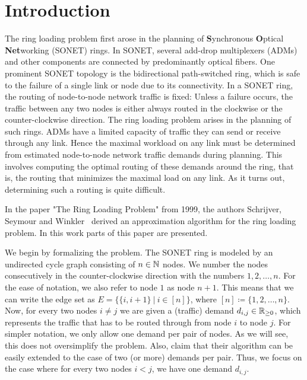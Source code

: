 \section{Introduction}

The ring loading problem first arose in the planning of \textbf{S}ynchronous \textbf{O}ptical \textbf{Net}working (SONET) rings.
In SONET, several add-drop multiplexers (ADMs) and other components are connected by predominantly optical fibers.
One prominent SONET topology is the bidirectional path-switched ring, which is safe to the failure of a single link or node due to its connectivity.
In a SONET ring, the routing of node-to-node network traffic is fixed: Unless a failure occurs, the traffic between any two nodes is either always routed in the clockwise or the counter-clockwise direction.
The ring loading problem arises in the planning of such rings.
ADMs have a limited capacity of traffic they can send or receive through any link.
Hence the maximal workload on any link must be determined from estimated node-to-node network traffic demands during planning.
This involves computing the optimal routing of these demands around the ring, that is, the routing that minimizes the maximal load on any link.
As it turns out, determining such a routing is quite difficult.

In the paper "The Ring Loading Problem" from 1999, the authors Schrijver, Seymour and Winkler~\cite{schrijver99} derived an approximation algorithm for the ring loading problem.
In this work parts of this paper are presented.

We begin by formalizing the problem.
The SONET ring is modeled by an undirected cycle graph consisting of $n \in \mathbb{N}$ nodes.
We number the nodes consecutively in the counter-clockwise direction with the numbers $1, 2, \dots, n$.
For the ease of notation, we also refer to node $1$ as node $n+1$.
This means that we can write the edge set as $E = \{\{i, i+1\}\ |\ i \in [n]\}$, where $[n] \coloneqq \{1, 2, \ldots, n\}$.
Now, for every two nodes $i \neq j$ we are given a (traffic) demand $d_{i, j} \in \mathbb{R}_{\geq 0}$, which represents the traffic that has to be routed through from node $i$ to node $j$.
For simpler notation, we only allow one demand per pair of nodes.
As we will see, this does not oversimplify the problem.
Also, \citet{schrijver99} claim that their algorithm can be easily extended to the case of two (or more) demands per pair.
Thus, we focus on the case where for every two nodes $i < j$, we have one demand $d_{i,j}$.

